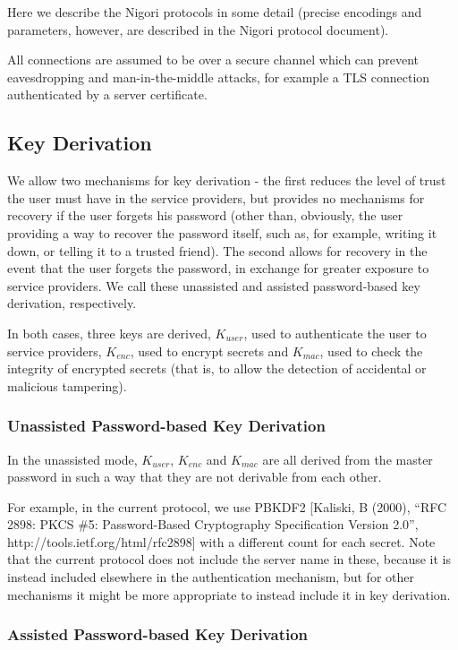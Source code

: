 \documentclass[a4paper,titlepage]{article}
\begin{document}
Here we describe the Nigori protocols in some detail (precise
encodings and parameters, however, are described in the Nigori
protocol document).

All connections are assumed to be over a secure channel which can
prevent eavesdropping and man-in-the-middle attacks, for example a TLS
connection authenticated by a server certificate.

\subsection{Key Derivation}

We allow two mechanisms for key derivation - the first reduces the
level of trust the user must have in the service providers, but
provides no mechanisms for recovery if the user forgets his password
(other than, obviously, the user providing a way to recover the
password itself, such as, for example, writing it down, or telling it
to a trusted friend). The second allows for recovery in the event that
the user forgets the password, in exchange for greater exposure to
service providers. We call these unassisted and assisted
password-based key derivation, respectively.

In both cases, three keys are derived, $K_{user}$, used to
authenticate the user to service providers, $K_{enc}$, used to encrypt
secrets and $K_{mac}$, used to check the integrity of encrypted
secrets (that is, to allow the detection of accidental or malicious
tampering).

\subsubsection{Unassisted Password-based Key Derivation}


In the unassisted mode, $K_{user}$, $K_{enc}$ and $K_{mac}$ are all derived from the master password in such a way that they are not derivable from each other.

For example, in the current protocol, we use PBKDF2 [Kaliski, B
  (2000), ``RFC 2898: PKCS \#5: Password-Based Cryptography
  Specification Version 2.0'', http://tools.ietf.org/html/rfc2898]
with a different count for each secret. Note that the current protocol
does not include the server name in these, because it is instead
included elsewhere in the authentication mechanism, but for other
mechanisms it might be more appropriate to instead include it in key
derivation.

\subsubsection{Assisted Password-based Key Derivation}
\end{document}
